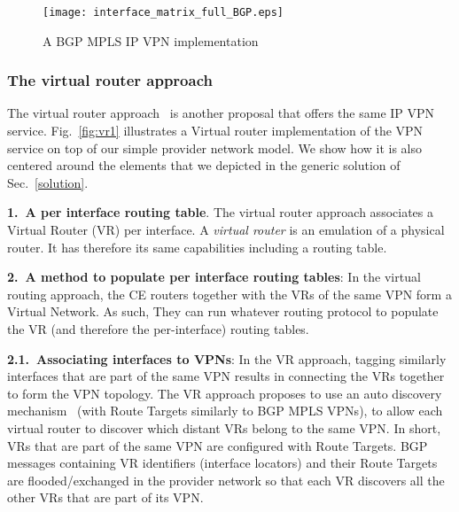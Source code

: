 \begin{figure}[h]
	\centering
		\texttt{[image: interface\_matrix\_full\_BGP.eps]}
	\caption{A BGP MPLS IP VPN implementation}\label{fig:Image9}
\end{figure}











































\subsubsection{The virtual router approach}
The virtual router approach~\cite{VR:draft} is another proposal that offers the same IP VPN service. Fig.~\ref{fig:vr1} illustrates a Virtual router implementation of the VPN service on top of our simple provider network model. We show how it is also centered around the elements that we depicted in the generic solution of Sec.~\ref{solution}.

\vspace{1mm}\noindent \textbf{1.~A per interface routing table}. The virtual router approach associates a Virtual Router (VR) per interface. A \textit{virtual router} is an emulation of a physical router. It has therefore its same capabilities including a routing table.
	
	\vspace{1mm}\noindent \textbf{2.~A method to populate per interface routing tables}: In the virtual routing approach, the CE routers together with the VRs of the same VPN form a Virtual Network. As such, They can run whatever routing protocol to populate the VR (and therefore the per-interface) routing tables.
	
\vspace{1mm}\noindent \textbf{2.1.~Associating interfaces to VPNs}: In the VR approach, tagging similarly interfaces that are part of the same VPN results in connecting the VRs together to form the VPN topology. The VR approach proposes to use an auto discovery mechanism~\cite{vpn-bgp} (with Route Targets similarly to BGP MPLS VPNs), to allow each virtual router to discover which distant VRs belong to the same VPN. In short, VRs that are part of the same VPN are configured with Route Targets. BGP messages containing VR identifiers (interface locators) and their Route Targets are flooded/exchanged in the provider network so that each VR discovers all the other VRs that are part of its VPN.
		 
